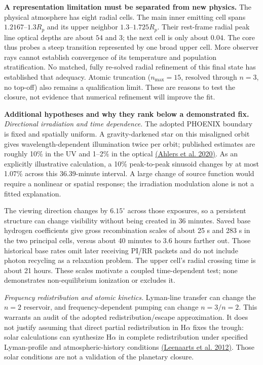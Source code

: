 \documentclass[10pt,a4paper]{article}
\begin{document}
\textbf{A representation limitation must be separated from new physics.}
The physical atmosphere has eight radial cells. The main inner emitting
cell spans $1.2167$--$1.3R_p$ and its upper neighbor $1.3$--$1.725R_p$.
Their rest-frame radial peak line optical depths are about $54$ and $3$;
the next cell is only about $0.04$. The core thus probes a steep transition
represented by one broad upper cell. More observer rays cannot establish
convergence of its temperature and population stratification. No matched,
fully re-solved radial refinement of this final state has established that
adequacy. Atomic truncation ($n_{\max}=15$, resolved through $n=3$, no top-off)
also remains a qualification limit. These are reasons to test the closure,
not evidence that numerical refinement will improve the fit.

\clearpage
\textbf{Additional hypotheses and why they rank below a demonstrated fix.}
\emph{Directional irradiation and time dependence.}
The adopted PHOENIX boundary is fixed and spatially uniform. A gravity-darkened
star on this misaligned orbit gives wavelength-dependent illumination twice
per orbit; published estimates are roughly 10\% in the UV and 1--2\% in the
optical \href{https://arxiv.org/html/2004.14812v1}{(Ahlers et al. 2020)}.
As an explicitly illustrative calculation, a 10\% peak-to-peak sinusoid
changes by at most 1.07\% across this 36.39-minute interval. A large change
of source function would require a nonlinear or spatial response; the
irradiation modulation alone is not a fitted explanation.

The viewing direction changes by $6.15^\circ$ across those exposures, so a
persistent structure can change visibility without being created in 36
minutes. Saved base hydrogen coefficients give gross recombination scales
of about 25 s and 283 s in the two principal cells, versus about 40 minutes
to 3.6 hours farther out. Those historical base rates omit later receiving
PI/RR packets and do not include photon recycling as a relaxation problem.
The upper cell's radial crossing time is about 21 hours. These scales
motivate a coupled time-dependent test; none demonstrates non-equilibrium
ionization or excludes it.

\emph{Frequency redistribution and atomic kinetics.}
Lyman-line transfer can change the $n=2$ reservoir, and frequency-dependent
pumping can change $n=3/n=2$. This warrants an audit of the adopted
redistribution/escape approximation. It does not justify assuming that
direct partial redistribution in H$\alpha$ fixes the trough: solar
calculations can synthesize H$\alpha$ in complete redistribution under
specified Lyman-profile and atmospheric-history conditions
\href{https://arxiv.org/abs/1202.1926}{(Leenaarts et al. 2012)}. Those solar
conditions are not a validation of the planetary closure.
\end{document}
